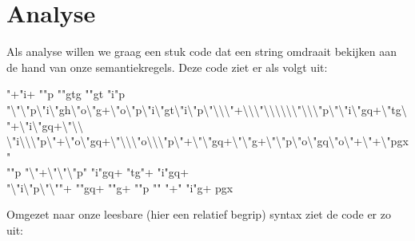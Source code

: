 \section{Analyse}
\label{sec:analyse}

Als analyse willen we graag een stuk code dat een string omdraait bekijken aan
de hand van onze semantiekregels. Deze code ziet er als volgt uit:

\begin{smurf}
	\footnotesize
	"+"i+ ""p ""gtg ""gt "i"p\\
	"\textbackslash{}"\textbackslash{}"p\textbackslash{}"i\textbackslash{}"gh\textbackslash{}"o\textbackslash{}"g+\textbackslash{}"o\textbackslash{}"p\textbackslash{}"i\textbackslash{}"gt\textbackslash{}"i\textbackslash{}"p\textbackslash{}"\textbackslash{}\textbackslash{}\textbackslash{}"+\textbackslash{}\textbackslash{}\textbackslash{}"\textbackslash{}\textbackslash{}\textbackslash{}\textbackslash{}\textbackslash{}\textbackslash{}"\textbackslash{}\textbackslash{}\textbackslash{}"p\textbackslash{}"\textbackslash{}"i\textbackslash{}"gq+\textbackslash{}"tg\textbackslash{}"+\textbackslash{}"i\textbackslash{}"gq+\textbackslash{}"\textbackslash{}\textbackslash{}\\
    \textbackslash{}"i\textbackslash{}\textbackslash{}\textbackslash{}"p\textbackslash{}"+\textbackslash{}"o\textbackslash{}"gq+\textbackslash{}"\textbackslash{}\textbackslash{}\textbackslash{}"o\textbackslash{}\textbackslash{}\textbackslash{}"p\textbackslash{}"+\textbackslash{}"\textbackslash{}"gq+\textbackslash{}"\textbackslash{}"g+\textbackslash{}"\textbackslash{}"p\textbackslash{}"o\textbackslash{}"gq\textbackslash{}"o\textbackslash{}"+\textbackslash{}"+\textbackslash{}"pgx"\\
	""p "\textbackslash{}"+\textbackslash{}"\textbackslash{}"\textbackslash{}"p" "i"gq+ "tg"+ "i"gq+\\
	"\textbackslash{}"i\textbackslash{}"p\textbackslash{}"\textbackslash{}""+ ""gq+ ""g+ ""p "" "+" "i"g+ pgx
\end{smurf}

Omgezet naar onze leesbare (hier een relatief begrip) syntax ziet de code er zo
uit:

